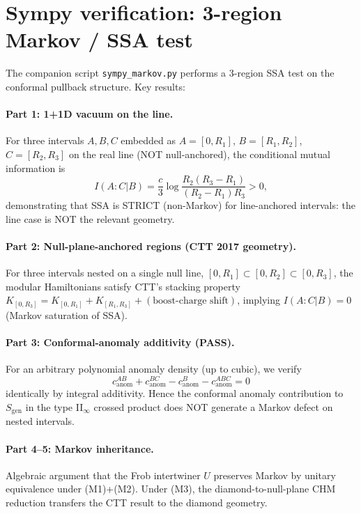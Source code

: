 \documentclass[11pt,a4paper]{article}
\theoremstyle{remark}
\newcommand{\Sgen}{S_{\mathrm{gen}}}
\begin{document}
\section{Sympy verification: 3-region Markov / SSA test}
\label{sec:sympy_markov}

The companion script \texttt{sympy\_markov.py} performs a 3-region SSA
test on the conformal pullback structure.  Key results:

\paragraph{Part 1: 1+1D vacuum on the line.}
For three intervals $A, B, C$ embedded as $A=[0,R_1]$, $B=[R_1,R_2]$,
$C=[R_2,R_3]$ on the real line (NOT null-anchored), the conditional
mutual information is
\[
  I(A:C|B) = \frac{c}{3}\log\!\frac{R_2(R_3 - R_1)}{(R_2 - R_1)R_3} > 0,
\]
demonstrating that SSA is STRICT (non-Markov) for line-anchored
intervals: the line case is NOT the relevant geometry.

\paragraph{Part 2: Null-plane-anchored regions (CTT 2017 geometry).}
For three intervals nested on a single null line,
$[0,R_1] \subset [0,R_2] \subset [0,R_3]$, the modular Hamiltonians
satisfy CTT's stacking property
$K_{[0,R_3]} = K_{[0,R_1]} + K_{[R_1,R_3]} + (\text{boost-charge shift})$,
implying $I(A:C|B) = 0$ (Markov saturation of SSA).

\paragraph{Part 3: Conformal-anomaly additivity (PASS).}
For an arbitrary polynomial anomaly density (up to cubic), we verify
\[
  c_{\mathrm{anom}}^{AB} + c_{\mathrm{anom}}^{BC} - c_{\mathrm{anom}}^{B}
   - c_{\mathrm{anom}}^{ABC} = 0
\]
identically by integral additivity.  Hence the conformal anomaly
contribution to $\Sgen$ in the type II$_\infty$ crossed product does
NOT generate a Markov defect on nested intervals.

\paragraph{Part 4--5: Markov inheritance.}
Algebraic argument that the Frob intertwiner $U$ preserves Markov by
unitary equivalence under (M1)+(M2).  Under (M3), the diamond-to-null-plane
CHM reduction transfers the CTT result to the diamond geometry.
\end{document}
